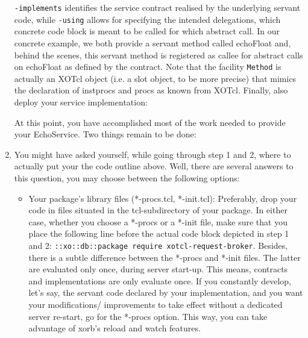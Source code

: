 \begin{enumerate}

\lstinline[frame=single]!-implements! identifies the service contract realised by the underlying servant code, while \lstinline[frame=single]!-using! allows for specifying the intended delegations, which concrete code block is meant to be called for which abstract call. In our concrete example, we both provide a servant method called echoFloat and, behind the scenes, this servant method is registered as callee for abstract calls on echoFloat as defined by the contract. Note that the facility  \lstinline[frame=single]!Method! is actually an XOTcl object (i.e. a slot object, to be more precise) that mimics the declaration of instprocs and procs as known from XOTcl. Finally, also deploy your service implementation:

At this point, you have accomplished most of the work needed to provide your EchoService. Two things remain to be done:
\item You might have asked yourself, while going through step 1 and 2, where to actually put your the code outline above. Well, there are several answers to this question, you may choose between the following options:
\begin{itemize}
\item Your package's library files (*-procs.tcl, *-init.tcl): Preferably, drop your code in files situated in the tcl-subdirectory of your package. In either case, whether you choose a *-procs or a *-init file, make sure that you place the following line before the actual code block depicted in step 1 and 2:
\lstinline!::xo::db::package require xotcl-request-broker!. Besides, there is a subtle difference between the *-procs and *-init files. The latter are evaluated only once, during server start-up. This means, contracts and implementations are only evaluate once. If you constantly develop, let's say, the servant code declared by your implementation, and you want your modifications/ improvements to take effect without a dedicated server re-start, go for the *-procs option. This way, you can take advantage of xorb's reload and watch features.

\end{itemize}
\end{enumerate}
